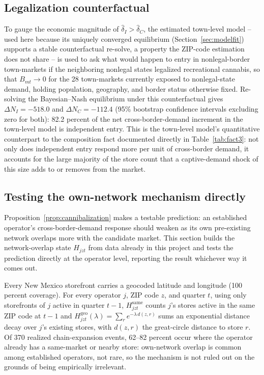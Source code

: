 \documentclass[english,12pt]{article}
\begin{document}
\subsection{Legalization counterfactual}
\label{sec:legalization_cf}

To gauge the economic magnitude of $\hat\delta_I>\hat\delta_C$, the estimated town-level model -- used here because its uniquely converged equilibrium (Section~\ref{sec:modelfit}) supports a stable counterfactual re-solve, a property the ZIP-code estimation does not share -- is used to ask what would happen to entry in nonlegal-border town-markets if the neighboring nonlegal states legalized recreational cannabis, so that $B_{mt}\to0$ for the 28 town-markets currently exposed to nonlegal-state demand, holding population, geography, and border status otherwise fixed. Re-solving the Bayesian--Nash equilibrium under this counterfactual gives $\Delta N_I = -518.0$ and $\Delta N_C = -112.4$ (95\% bootstrap confidence intervals excluding zero for both): 82.2 percent of the net cross-border-demand increment in the town-level model is independent entry. This is the town-level model's quantitative counterpart to the composition fact documented directly in Table~\ref{tab:fact3}: not only does independent entry respond more per unit of cross-border demand, it accounts for the large majority of the store count that a captive-demand shock of this size adds to or removes from the market.

\subsection{Testing the own-network mechanism directly}
\label{sec:mechreg}

Proposition~\ref{prop:cannibalization} makes a testable prediction: an established operator's cross-border-demand response should weaken as its own pre-existing network overlaps more with the candidate market. This section builds the network-overlap state $H_{jzt}$ from data already in this project and tests the prediction directly at the operator level, reporting the result whichever way it comes out.

Every New Mexico storefront carries a geocoded latitude and longitude (100 percent coverage). For every operator $j$, ZIP code $z$, and quarter $t$, using only storefronts of $j$ active in quarter $t-1$, $H^{\text{same}}_{jzt}$ counts $j$'s stores active in the same ZIP code at $t-1$ and $H^{\text{geo}}_{jzt}(\lambda)=\sum_{r} e^{-\lambda\,d(z,r)}$ sums an exponential distance decay over $j$'s existing stores, with $d(z,r)$ the great-circle distance to store $r$. Of 370 realized chain-expansion events, 62--82 percent occur where the operator already has a same-market or nearby store: own-network overlap is common among established operators, not rare, so the mechanism is not ruled out on the grounds of being empirically irrelevant.
\end{document}

